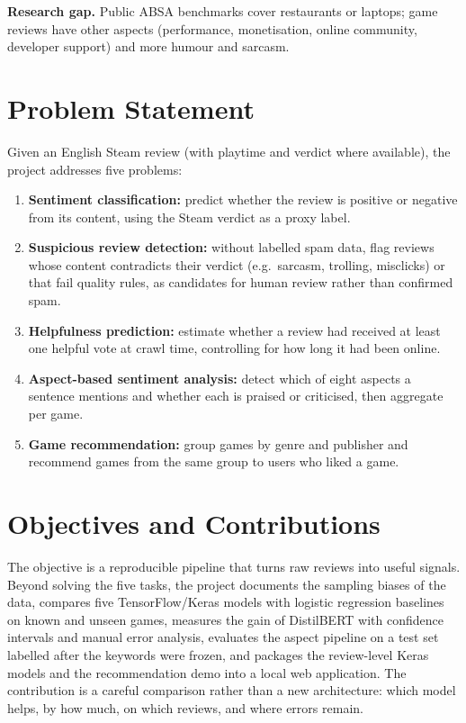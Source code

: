 \textbf{Research gap.} Public ABSA benchmarks cover restaurants or laptops; game reviews have other aspects (performance, monetisation, online community, developer support) and more humour and sarcasm.

\section{Problem Statement}
\label{sec:problem}

Given an English Steam review (with playtime and verdict where available), the project addresses five problems:
\begin{enumerate}
    \item \textbf{Sentiment classification:} predict whether the review is positive or negative from its content, using the Steam verdict as a proxy label.
    \item \textbf{Suspicious review detection:} without labelled spam data, flag reviews whose content contradicts their verdict (e.g.\ sarcasm, trolling, misclicks) or that fail quality rules, as candidates for human review rather than confirmed spam.
    \item \textbf{Helpfulness prediction:} estimate whether a review had received at least one helpful vote at crawl time, controlling for how long it had been online.
    \item \textbf{Aspect-based sentiment analysis:} detect which of eight aspects a sentence mentions and whether each is praised or criticised, then aggregate per game.
    \item \textbf{Game recommendation:} group games by genre and publisher and recommend games from the same group to users who liked a game.
\end{enumerate}

\section{Objectives and Contributions}

The objective is a reproducible pipeline that turns raw reviews into useful signals. Beyond solving the five tasks, the project documents the sampling biases of the data, compares five TensorFlow/Keras models with logistic regression baselines on known and unseen games, measures the gain of DistilBERT with confidence intervals and manual error analysis, evaluates the aspect pipeline on a test set labelled after the keywords were frozen, and packages the review-level Keras models and the recommendation demo into a local web application. The contribution is a careful comparison rather than a new architecture: which model helps, by how much, on which reviews, and where errors remain.

